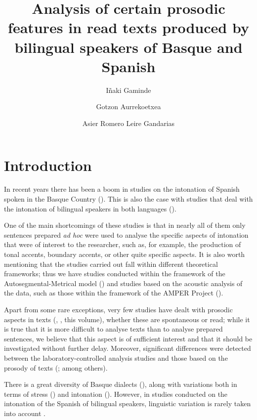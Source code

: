 \documentclass[output=paper]{langsci/langscibook}
\author{Iñaki Gaminde\and
Gotzon Aurrekoetxea\and
Asier Romero\lastand
Leire Gandarias\affiliation{(UPV/EHU)\footnote{This project has received financial support from the University of the Basque Country (GIU13/23) for the 3 years 2014–2016.}}
}
\title{Analysis of certain prosodic features in read texts produced by bilingual speakers of Basque and Spanish}
\begin{document}
\label{chap:gam}

\section{Introduction}

  In recent years there has been a boom in studies on the intonation of Spanish spoken in the Basque Country (\citealt{CallejaAzpiazu.2004,ElejabeitiaOrtuondo.2005,ElejabeitiaOrtuondo.2007,ElejabeitiaOrtuondo.2007b,ElejabeitiaOrtuondo.2008,Elordieta.2012,RoblesPuente.2011,RoblesPuente.2012}). This is also the case with studies that deal with the intonation of bilingual speakers in both languages (\citealt{Elordieta.2003intonationspanish,Elordieta.2006,Elordieta.2005,Gaminde.2010,Gaminde.2011b,Gaminde.2013,Gaminde.2013b,Gaminde.2014,Romero.2014}).

  One of the main shortcomings of these studies is that in nearly all of them only sentences prepared \textit{ad hoc} were used to analyse the specific aspects of intonation that were of interest to the researcher, such as, for example, the production of tonal accents, boundary accents, or other quite specific aspects. It is also worth mentioning that the studies carried out fall within different theoretical frameworks; thus we have studies conducted within the framework of the Autosegmental-Metrical model (\citealt{Elordieta.2003intonationbasque,Elordieta.2006,Elordieta.2005,Gaminde.2010,Gaminde.2011b,Elordieta.2016}) and studies based on the acoustic analysis of the data, such as those within the framework of the AMPER Project (\citealt{ElejabeitiaOrtuondo.2007,ElejabeitiaOrtuondo.2007b,ElejabeitiaOrtuondo.2008}).

  Apart from some rare exceptions, very few studies have dealt with prosodic aspects in texts (\citealt{Gaminde.2007b,Gaminde.2010,Gaminde.2012,Gaminde.2013,Romero.2015}, \citeauthor{GarridoAlminana.2018}, this volume), whether these are spontaneous or read; while it is true that it is more difficult to analyse texts than to analyse prepared sentences, we believe that this aspect is of sufficient interest and that it should be investigated without further delay. Moreover, significant differences were detected between the laboratory-controlled analysis studies and those based on the prosody of texts (\citealt{Face2003,Rao.2006,Gaminde.2010}; among others).

There is a great diversity of Basque dialects (\citealt{Zuazo.1998,Zuazo.2003,Zuazo.2005}), along with variations both in terms of stress (\citealt{Hualde.1997,Hualde.1999,Hualde.2006,Hualde.2011,Gaminde.1998,Gaminde.2007,Gaminde.2011,Aurrekoetxea.2013}) and intonation (\citealt{Elordieta.2011,Aurrekoetxea.2014}). However, in studies conducted on the intonation of the Spanish of bilingual speakers, linguistic variation is rarely taken into account \citep{Gaminde.2010}.
\end{document}
